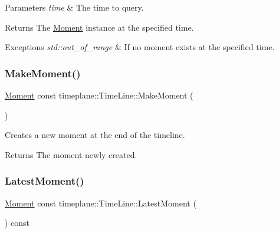 \begin{DoxyParams}{Parameters}
{\em time} & The time to query. \\
\hline
\end{DoxyParams}
\begin{DoxyReturn}{Returns}
The {\ttfamily \hyperlink{classtimeplane_1_1_moment}{Moment}} instance at the specified time. 
\end{DoxyReturn}

\begin{DoxyExceptions}{Exceptions}
{\em std\+::out\+\_\+of\+\_\+range} & If no moment exists at the specified time. \\
\hline
\end{DoxyExceptions}
\mbox{\label{classtimeplane_1_1_time_line_a7520362a8b33962371b1a47831b37b03}} 
\subsubsection{\texorpdfstring{Make\+Moment()}{MakeMoment()}}
{\footnotesize\ttfamily \hyperlink{classtimeplane_1_1_moment}{Moment} const timeplane\+::\+Time\+Line\+::\+Make\+Moment (\begin{DoxyParamCaption}{ }\end{DoxyParamCaption})}



Creates a new moment at the end of the timeline. 

\begin{DoxyReturn}{Returns}
The moment newly created. 
\end{DoxyReturn}
\mbox{\label{classtimeplane_1_1_time_line_acc391553e5c45a647c82f27e53ae3af8}} 
\subsubsection{\texorpdfstring{Latest\+Moment()}{LatestMoment()}}
{\footnotesize\ttfamily \hyperlink{classtimeplane_1_1_moment}{Moment} const timeplane\+::\+Time\+Line\+::\+Latest\+Moment (\begin{DoxyParamCaption}{ }\end{DoxyParamCaption}) const\hspace{0.3cm}{\ttfamily [noexcept]}}



